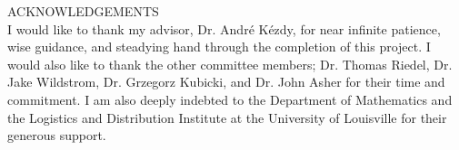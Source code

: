 \begin{center}

ACKNOWLEDGEMENTS\\

I would like to thank my advisor, Dr. Andr\'e K\'ezdy, for near infinite patience, wise guidance, and steadying hand through the completion of this project.  I would also like to thank the other committee members; Dr. Thomas Riedel, Dr. Jake Wildstrom, Dr. Grzegorz Kubicki, and Dr. John Asher for their time and commitment.  I am also deeply indebted to the Department of Mathematics and the Logistics and Distribution Institute at the University of Louisville for their generous support.  

\end{center}